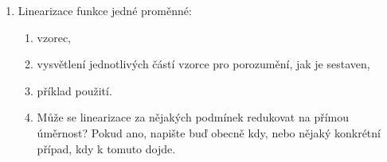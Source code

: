 \documentclass[12pt]{article}
\begin{document}
\begin{enumerate}
  
\item Linearizace funkce jedné proměnné:
  \begin{enumerate}
  \item vzorec, 
  \item vysvětlení jednotlivých částí vzorce pro porozumění,
    jak je sestaven,
  \item příklad použití.
  \item Může se linearizace za nějakých podmínek redukovat na přímou
    úměrnost? Pokud ano, napište buď obecně kdy, nebo nějaký konkrétní
    případ, kdy k tomuto dojde.
\end{enumerate}


  
\end{enumerate}
\end{document}
